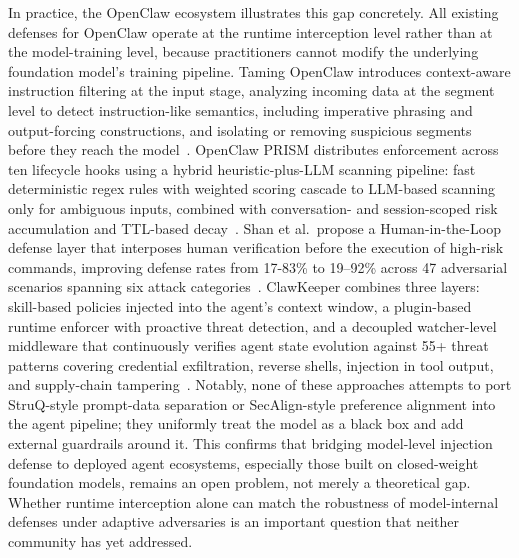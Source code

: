 In practice, the OpenClaw ecosystem illustrates this gap concretely. All existing defenses for OpenClaw operate at the runtime interception level rather than at the model-training level, because practitioners cannot modify the underlying foundation model's training pipeline. Taming OpenClaw introduces context-aware instruction filtering at the input stage, analyzing incoming data at the segment level to detect instruction-like semantics, including imperative phrasing and output-forcing constructions, and isolating or removing suspicious segments before they reach the model~\cite{tamingopenclaw2026}. OpenClaw PRISM distributes enforcement across ten lifecycle hooks using a hybrid heuristic-plus-LLM scanning pipeline: fast deterministic regex rules with weighted scoring cascade to LLM-based scanning only for ambiguous inputs, combined with conversation- and session-scoped risk accumulation and TTL-based decay~\cite{openclawprism2026}. Shan et al.\ propose a Human-in-the-Loop defense layer that interposes human verification before the execution of high-risk commands, improving defense rates from 17-83\% to 19--92\% across 47 adversarial scenarios spanning six attack categories~\cite{shan2026dontletclawgrip}. ClawKeeper combines three layers: skill-based policies injected into the agent's context window, a plugin-based runtime enforcer with proactive threat detection, and a decoupled watcher-level middleware that continuously verifies agent state evolution against 55+ threat patterns covering credential exfiltration, reverse shells, injection in tool output, and supply-chain tampering~\cite{clawkeeper2026}. Notably, none of these approaches attempts to port StruQ-style prompt-data separation or SecAlign-style preference alignment into the agent pipeline; they uniformly treat the model as a black box and add external guardrails around it. This confirms that bridging model-level injection defense to deployed agent ecosystems, especially those built on closed-weight foundation models, remains an open problem, not merely a theoretical gap. Whether runtime interception alone can match the robustness of model-internal defenses under adaptive adversaries is an important question that neither community has yet addressed.

